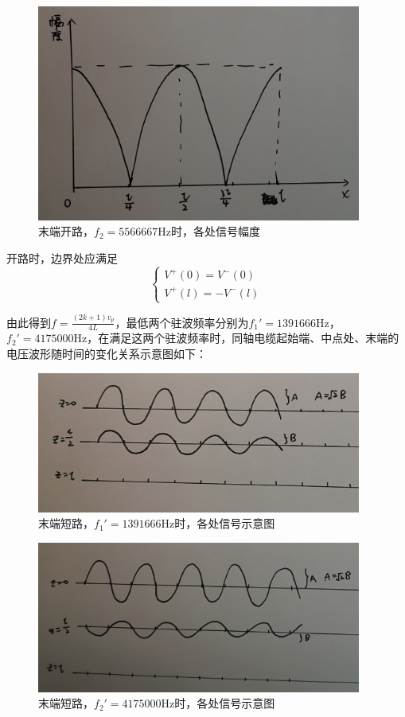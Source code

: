 \documentclass[UTF8]{ctexart}
\begin{document}
\begin{figure}[H]
\centering
\includegraphics[width=0.95\textwidth]{L.jpg}
\caption{末端开路，$f_2=5566667$Hz时，各处信号幅度}
\end{figure}


开路时，边界处应满足
\begin{equation}
\left\{
    \begin{array}{l}
            V^+(0)=V^-(0) \\  V^+(l)=-V^-(l)
        \end{array}
\right.
\end{equation}

由此得到$f=\frac{(2k+1)v_p}{4L}$，最低两个驻波频率分别为$f_1'=1391666$Hz，$f_2'=4175000$Hz，在满足这两个驻波频率时，同轴电缆起始端、中点处、末端的电压波形随时间的变化关系示意图如下：

\begin{figure}[H]
\centering
\includegraphics[width=0.95\textwidth]{I.jpg}
\caption{末端短路，$f_1'=1391666$Hz时，各处信号示意图}
\end{figure}

\begin{figure}[H]
\centering
\includegraphics[width=0.95\textwidth]{J.jpg}
\caption{末端短路，$f_2'=4175000$Hz时，各处信号示意图}
\end{figure}
\end{document}
